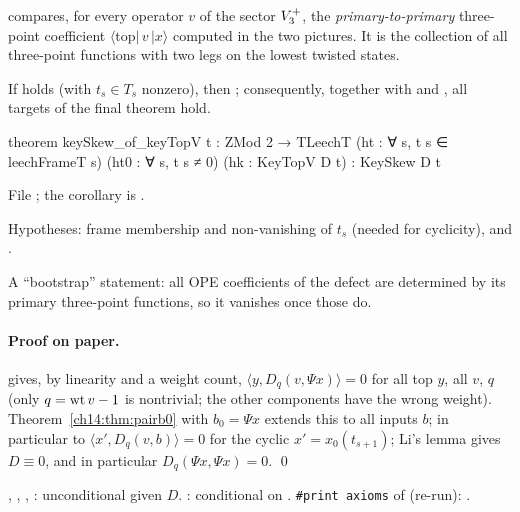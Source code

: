 \begin{physics}
 compares, for every operator $v$ of the sector $V_3^{+}$, the \emph{primary-to-primary}
three-point coefficient $\langle\text{top}|\,v\,|x\rangle$ computed in the two pictures.  It is the
collection of all three-point functions with two legs on the lowest twisted states.
\end{physics}

\begin{theorem}\label{ch14:thm:keytopv}
If  holds (with $t_s\in T_s$ nonzero), then ; consequently, together with
 and , all targets of the final theorem hold.
\end{theorem}
\begin{leancode}
theorem keySkew_of_keyTopV {t : ZMod 2 → TLeechT} (ht : ∀ s, t s ∈ leechFrameT s)
    (ht0 : ∀ s, t s ≠ 0) (hk : KeyTopV D t) : KeySkew D t
\end{leancode}
File ; the corollary is .

\begin{dictionary}
Hypotheses: frame membership and non-vanishing of $t_s$ (needed for cyclicity), and .
\end{dictionary}

\begin{physics}
A ``bootstrap'' statement: all OPE coefficients of the defect are determined by its primary
three-point functions, so it vanishes once those do.
\end{physics}

\paragraph{Proof on paper.}   gives, by linearity and a weight count,
$\langle y,D_q(v,\Psi x)\rangle=0$ for all top $y$, all $v$, $q$ (only $q=\operatorname{wt} v-1$ is nontrivial; the other
components have the wrong weight).  Theorem~\ref{ch14:thm:pairb0} with $b_0=\Psi x$ extends this to all
inputs $b$; in particular to $\langle x',D_q(v,b)\rangle=0$ for the cyclic $x'=x_0(t_{s+1})$; Li's lemma
gives $D\equiv0$, and in particular $D_q(\Psi x,\Psi x)=0$. \qed

\begin{status}
, , , : unconditional given $D$.
: conditional on .  \texttt{\#print axioms} of 
(re-run): .
\end{status}

